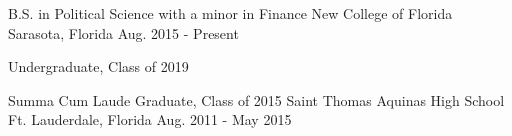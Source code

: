 

\begin{cventries}

  \cventry
    {B.S. in Political Science with a minor in Finance} %
    {New College of Florida} %
    {Sarasota, Florida} %
    {Aug. 2015 - Present} %
    {
      \begin{cvitems} %
        \item {Undergraduate, Class of 2019}
      \end{cvitems}
    }

  \cventry
    {Summa Cum Laude Graduate, Class of 2015} %
    {Saint Thomas Aquinas High School} %
    {Ft. Lauderdale, Florida} %
    {Aug. 2011 - May 2015} %
    {}


\vspace{-.25cm}


\end{cventries}
